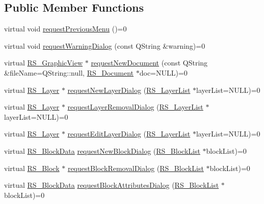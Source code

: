 \subsection*{Public Member Functions}
\begin{DoxyCompactItemize}
\item 
virtual void \hyperlink{classRS__DialogFactoryInterface_ad524d6d4c69cca7e5f69c1cff6b89130}{request\-Previous\-Menu} ()=0
\item 
virtual void \hyperlink{classRS__DialogFactoryInterface_a1fc58550b66870c2c5a48e566463310f}{request\-Warning\-Dialog} (const Q\-String \&warning)=0
\item 
virtual \hyperlink{classRS__GraphicView}{R\-S\-\_\-\-Graphic\-View} $\ast$ \hyperlink{classRS__DialogFactoryInterface_a40deafb82c660a6a14a4a3d08a1cca4c}{request\-New\-Document} (const Q\-String \&file\-Name=Q\-String\-::null, \hyperlink{classRS__Document}{R\-S\-\_\-\-Document} $\ast$doc=N\-U\-L\-L)=0
\item 
virtual \hyperlink{classRS__Layer}{R\-S\-\_\-\-Layer} $\ast$ \hyperlink{classRS__DialogFactoryInterface_a743781e36b98bc37ed22de05b04acaab}{request\-New\-Layer\-Dialog} (\hyperlink{classRS__LayerList}{R\-S\-\_\-\-Layer\-List} $\ast$layer\-List=N\-U\-L\-L)=0
\item 
virtual \hyperlink{classRS__Layer}{R\-S\-\_\-\-Layer} $\ast$ \hyperlink{classRS__DialogFactoryInterface_ad07c7382124a0b0e423d11d9bfbb8cf7}{request\-Layer\-Removal\-Dialog} (\hyperlink{classRS__LayerList}{R\-S\-\_\-\-Layer\-List} $\ast$layer\-List=N\-U\-L\-L)=0
\item 
virtual \hyperlink{classRS__Layer}{R\-S\-\_\-\-Layer} $\ast$ \hyperlink{classRS__DialogFactoryInterface_adb533740ea219696d9ecbdcd34ae4df4}{request\-Edit\-Layer\-Dialog} (\hyperlink{classRS__LayerList}{R\-S\-\_\-\-Layer\-List} $\ast$layer\-List=N\-U\-L\-L)=0
\item 
virtual \hyperlink{classRS__BlockData}{R\-S\-\_\-\-Block\-Data} \hyperlink{classRS__DialogFactoryInterface_a804b0b5dd9eac9f02660a6a38303800b}{request\-New\-Block\-Dialog} (\hyperlink{classRS__BlockList}{R\-S\-\_\-\-Block\-List} $\ast$block\-List)=0
\item 
virtual \hyperlink{classRS__Block}{R\-S\-\_\-\-Block} $\ast$ \hyperlink{classRS__DialogFactoryInterface_a7027f9ee4a7f8c5cb85bd390a0a5235c}{request\-Block\-Removal\-Dialog} (\hyperlink{classRS__BlockList}{R\-S\-\_\-\-Block\-List} $\ast$block\-List)=0
\item 
virtual \hyperlink{classRS__BlockData}{R\-S\-\_\-\-Block\-Data} \hyperlink{classRS__DialogFactoryInterface_a28c6bbcf943257ac6bbfc9f347e16a72}{request\-Block\-Attributes\-Dialog} (\hyperlink{classRS__BlockList}{R\-S\-\_\-\-Block\-List} $\ast$block\-List)=0

\end{DoxyCompactItemize}
